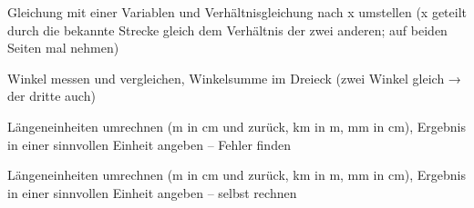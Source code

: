 \begin{aufgabe}{Gleichung mit einer Variablen und Verhältnisgleichung nach x umstellen (x geteilt durch die bekannte Strecke gleich dem Verhältnis der zwei anderen; auf beiden Seiten mal nehmen)}
\end{aufgabe}

\begin{aufgabe}{Winkel messen und vergleichen, Winkelsumme im Dreieck (zwei Winkel gleich → der dritte auch)}
\end{aufgabe}

\begin{aufgabe}{Längeneinheiten umrechnen (m in cm und zurück, km in m, mm in cm), Ergebnis in einer sinnvollen Einheit angeben – Fehler finden}
\end{aufgabe}

\begin{aufgabe}{Längeneinheiten umrechnen (m in cm und zurück, km in m, mm in cm), Ergebnis in einer sinnvollen Einheit angeben – selbst rechnen}
\end{aufgabe}
